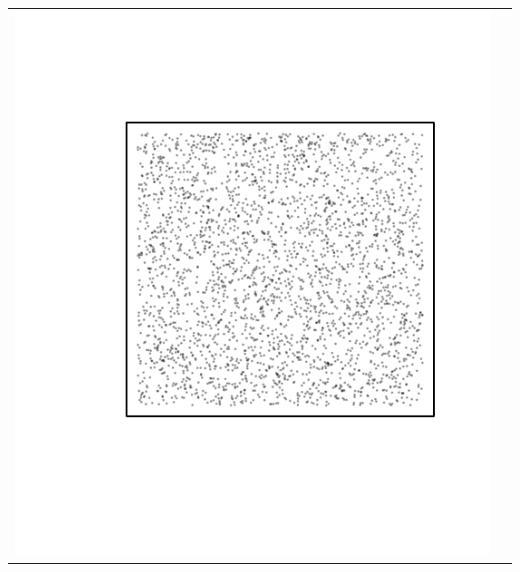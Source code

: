 \documentclass{article}\usepackage{graphicx, color}
\makeatletter
\def\maxwidth{ %
  \ifdim\Gin@nat@width>\linewidth
    \linewidth
  \else
    \Gin@nat@width
  \fi
}
\newenvironment{knitrout}{}{} %
\makeatother
\begin{document}
\vspace*{-1.75in}
\begin{tabular}{cc}
\begin{knitrout}
\definecolor{shadecolor}{rgb}{0.969, 0.969, 0.969}\color{fgcolor}\includegraphics[width=\maxwidth]{figure/unnamed-chunk-13} 
\end{knitrout}


\end{tabular}
\end{document}
